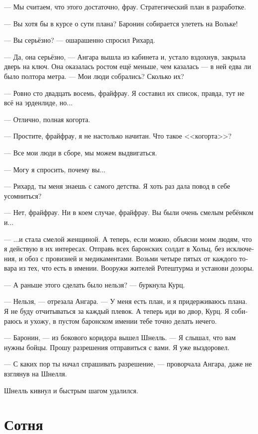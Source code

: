 \documentclass[a4paper,12pt,fleqn]{book}\usepackage{cooltooltips}\usepackage{polyglossia}\setdefaultlanguage[babelshorthands=true]{russian}\setotherlanguage{english}\defaultfontfeatures{Ligatures=TeX,Mapping=tex-text} \usepackage{xcolor}\definecolor{lightgray}{HTML}{bbbbbb}\color{lightgray}\newcommand{\ml}[3]{\textenglish{\textcolor{black}{#3}}}
\begin{document}
--- Мы считаем, что этого достаточно, фрау.
Стратегический план в разработке.

--- Вы хотя бы в курсе о сути плана?
Баронин собирается улететь на Вольке!

--- Вы серьёзно? --- ошарашенно спросил Рихард.

--- Да, она серьёзно, --- Ангара вышла из кабинета и, устало вздохнув, закрыла дверь на ключ.
Она оказалась ростом ещё меньше, чем казалась --- в ней едва ли было полтора метра.
--- Мои люди собрались?
Сколько их?

--- Ровно сто двадцать восемь, фрайфрау.
Я составил их список, правда, тут не всё на эрденлиде, но...

--- Отлично, полная когорта.

--- Простите, фрайфрау, я не настолько начитан.
Что такое <<когорта>>?

--- Все мои люди в сборе, мы можем выдвигаться.

--- Могу я спросить, почему вы...

--- Рихард, ты меня знаешь с самого детства.
Я хоть раз дала повод в себе усомниться?

--- Нет, фрайфрау.
Ни в коем случае, фрайфрау.
Вы были очень смелым ребёнком и...

--- ...и стала смелой женщиной.
А теперь, если можно, объясни моим людям, что я действую в их интересах.
Отправь всех баронских солдат в Хольц, без исключения, и обоз с провизией и медикаментами.
Возьми четыре пятых от каждого товара из тех, что есть в имении.
Вооружи жителей Ротештурма и установи дозоры.

--- А раньше этого сделать было нельзя? --- буркнула Курц.

--- Нельзя, --- отрезала Ангара.
--- У меня есть план, и я придерживаюсь плана.
Я не буду отчитываться за каждый плевок.
А теперь иди во двор, Курц.
Я собираюсь и ухожу, в пустом баронском имении тебе точно делать нечего.

--- Баронин, --- из бокового коридора вышел Шнелль.
--- Я слышал, что вам нужны бойцы.
Прошу разрешения отправиться с вами.
Я уже выздоровел.

--- С каких пор ты начал спрашивать разрешение, --- проворчала Ангара, даже не взглянув на Шнелля.

Шнелль кивнул и быстрым шагом удалился.

\section{Сотня}
\end{document}
